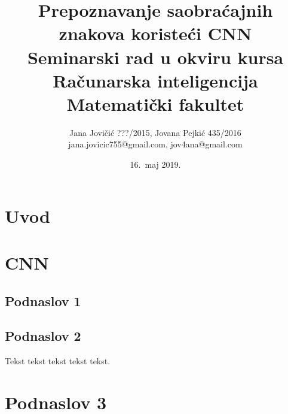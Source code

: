 \documentclass[a4paper]{article}
\begin{document}
\title{Prepoznavanje saobraćajnih znakova koristeći CNN\\ \small{Seminarski rad u okviru kursa\\Računarska inteligencija\\ Matematički fakultet}}

\author{Jana Jovičić ???/2015, Jovana Pejkić 435/2016 \\ jana.jovicic755@gmail.com, jov4ana@gmail.com}

\date{16.~maj 2019.}

\maketitle

\abstract{

}

\tableofcontents

\newpage

\section{Uvod}
\label{sec:uvod}



\section{CNN}
\label{sec:cnn}



\subsection{Podnaslov 1}



\subsection{Podnaslov 2}

Tekst tekst tekst tekst tekst.



\section{Podnaslov 3}	
\label{sec:podnaslov3}
\end{document}

